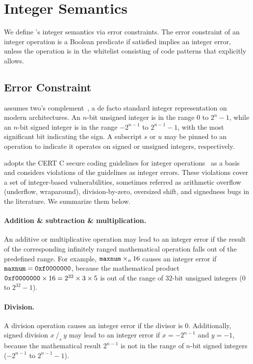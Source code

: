 \section{Integer Semantics}
\label{s:sema}

We define \sys's integer semantics via error constraints.  The error
constraint of an integer operation is a Boolean predicate if satisfied
implies an integer error, unless the operation is in the whitelist
consisting of code patterns that \sys explicitly allows.

\subsection{Error Constraint}
\label{s:sema:constr}

\sys assumes two's complement~\cite[\chapterautorefname~4.2.1]{intel:vol1},
a de facto standard integer representation on modern architectures.
An $n$-bit unsigned integer is in the range $0$ to $2^n-1$, while
an $n$-bit signed integer is in the range $-2^{n-1}$ to $2^{n-1}-1$,
with the most significant bit indicating the sign.  A subscript $s$
or $u$ may be pinned to an operation to indicate it operates on
signed or unsigned integers, respectively.

\sys adopts the CERT C secure coding guidelines for integer
operations~\cite[\chapterautorefname~5]{seacord:secure-c} as a basis
and considers violations of the guidelines as integer errors.  These
violations cover a set of integer-based vulnerabilities, sometimes
referred as arithmetic overflow (underflow, wraparound), division-by-zero,
oversized shift, and signedness bugs in the literature.  We summarize
them below.
\fi

\paragraph{Addition \& subtraction \& multiplication.}
An additive or multiplicative operation may lead to an integer error
if the result of the corresponding infinitely ranged mathematical
operation falls out of the predefined range.  For example,
$\texttt{maxnum}\times_u 16$ causes an integer error if $\texttt{maxnum} =
\texttt{0xf0000000}$, because the mathematical product $\texttt{0xf0000000}
\times 16 = 2^{32}\times 3\times 5$ is out of the range of $32$-bit
unsigned integers ($0$ to $2^{32} - 1$).

\paragraph{Division.}
A division operation causes an integer error if the divisor is 0.
Additionally, signed division $x\ /_s\ y$ may lead to an integer
error if $x = -2^{n-1}$ and $y = -1$, because the mathematical
result $2^{n-1}$ is not in the range of $n$-bit signed integers
($-2^{n-1}$ to $2^{n-1}-1$).


